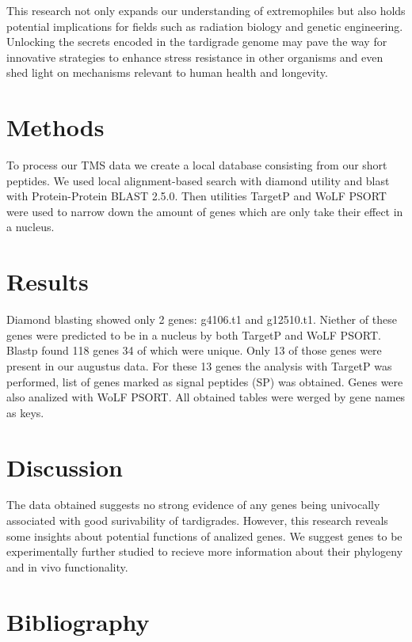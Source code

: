 \documentclass{article}
\begin{document}
This research not only expands our understanding of extremophiles but also holds potential implications for fields such as radiation biology and genetic engineering. Unlocking the secrets encoded in the tardigrade genome may pave the way for innovative strategies to enhance stress resistance in other organisms and even shed light on mechanisms relevant to human health and longevity.

\section{Methods}
To process our TMS data we create a local database consisting from our short peptides. We used local alignment-based search with diamond \cite{buchfink_fast_2015} utility and blast with Protein-Protein BLAST 2.5.0. Then utilities TargetP \cite{armenteros_detecting_2019} and WoLF PSORT \cite{noauthor_wolf_nodate} were used to narrow down the amount of genes which are only take their effect in a nucleus. 

\section{Results}
Diamond blasting showed only 2 genes: g4106.t1 and g12510.t1. Niether of these genes were predicted to be in a nucleus by both TargetP and WoLF PSORT. Blastp found 118 genes 34 of which were unique. Only 13 of those genes were present in our augustus data. For these 13 genes the analysis with TargetP was performed, list of genes marked as signal peptides (SP) was obtained. Genes were also analized with WoLF PSORT. All obtained tables were werged by gene names as keys.

\section{Discussion}
The data obtained suggests no strong evidence of any genes being univocally associated with good surivability of tardigrades. However, this research reveals some insights about potential functions of analized genes. We suggest  genes to be experimentally further studied to recieve more information about their phylogeny and in vivo functionality.

\newpage
\section{Bibliography}


\end{document}
